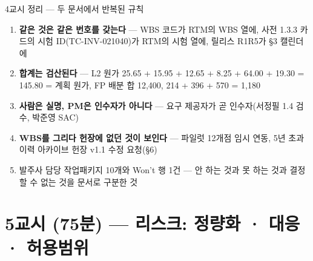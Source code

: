 \begin{frame}{4교시 정리 — 두 문서에서 반복된 규칙}
\begin{enumerate}
\item \textbf{같은 것은 같은 번호를 갖는다} — WBS 코드가 RTM의 WBS 열에, 사전 1.3.3 카드의 시험 ID(TC-INV-021\til{}040)가 RTM의 시험 열에, 릴리스 R1\til{}R5가 §3 캘린더에
\item \textbf{합계는 검산된다} — L2 원가 25.65 + 15.95 + 12.65 + 8.25 + 64.00 + 19.30 = 145.80 = 계획 원가, FP 배분 합 12,400, 214 + 396 + 570 = 1,180
\item \textbf{사람은 실명, PM은 인수자가 아니다} — 요구 제공자가 곧 인수자(서정필 \ra{} 1.4 검수, 박준영 \ra{} SAC)
\item \textbf{WBS를 그리다 헌장에 없던 것이 보인다} — 파일럿 12개점 임시 연동, 5년 초과 이력 아카이브 \ra{} 헌장 v1.1 수정 요청(§6)
\item 발주사 담당 작업패키지 10개와 Won't 행 1건 — 안 하는 것과 못 하는 것과 결정할 수 없는 것을 문서로 구분한 것
\end{enumerate}
\end{frame}

\section{5교시 (75분) — 리스크: 정량화 · 대응 · 허용범위}

